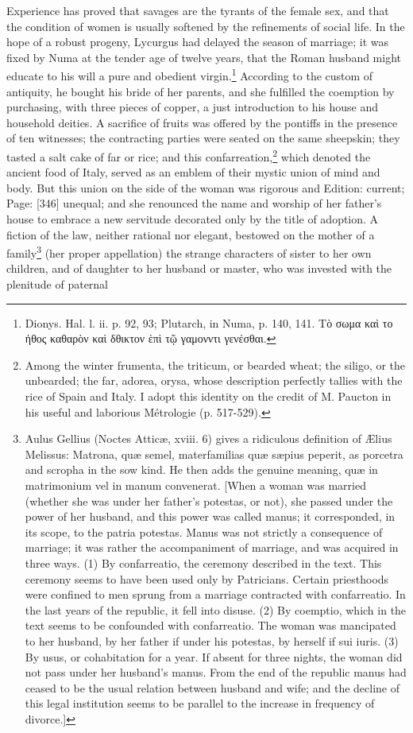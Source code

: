 Experience has proved that savages are the tyrants of the female sex, and that the condition of women is usually softened by the refinements of social life. In the hope of a robust progeny, Lycurgus had delayed the season of marriage; it was fixed by Numa at the tender age of twelve years, that the Roman husband might educate to his will a pure and obedient virgin.\footnote{Dionys. Hal. l. ii. p. 92, 93; Plutarch, in Numa, p. 140, 141. \textgreek{Τ\texthebrew{ὸ} σωμα κα\texthebrew{ὶ} το \texthebrew{ἠ}θος καθαρ\texthebrew{ὸ}ν κα\texthebrew{ὶ} δθικτον \texthebrew{ὲ}π\texthebrew{ὶ} τ\texthebrew{ῷ} γαμονντι γενέσθαι}.} According to the custom of antiquity, he bought his bride of her parents, and she fulfilled the coemption by purchasing, with three pieces of copper, a just introduction to his house and household deities. A sacrifice of fruits was offered by the pontiffs in the presence of ten witnesses; the contracting parties were seated on the same sheepskin; they tasted a salt cake of far or rice; and this confarreation,\footnote{Among the winter frumenta, the triticum, or bearded wheat; the siligo, or the unbearded; the far, adorea, orysa, whose description perfectly tallies with the rice of Spain and Italy. I adopt this identity on the credit of M. Paucton in his useful and laborious Métrologie (p. 517-529).} which denoted the ancient food of Italy, served as an emblem of their mystic union of mind and body. But this union on the side of the woman was rigorous and Edition: current; Page: [346] unequal; and she renounced the name and worship of her father\texthebrew{}’s house to embrace a new servitude decorated only by the title of adoption. A fiction of the law, neither rational nor elegant, bestowed on the mother of a family\footnote{Aulus Gellius (Noctes Atticæ, xviii. 6) gives a ridiculous definition of Ælius Melissus: Matrona, quæ semel, materfamilias quæ sæpius peperit, as porcetra and scropha in the sow kind. He then adds the genuine meaning, quæ in matrimonium vel in manum convenerat. [When a woman was married (whether she was under her father\texthebrew{}’s potestas, or not), she passed under the power of her husband, and this power was called manus; it corresponded, in its scope, to the patria potestas. Manus was not strictly a consequence of marriage; it was rather the accompaniment of marriage, and was acquired in three ways. (1) By confarreatio, the ceremony described in the text. This ceremony seems to have been used only by Patricians. Certain priesthoods were confined to men sprung from a marriage contracted with confarreatio. In the last years of the republic, it fell into disuse. (2) By coemptio, which in the text seems to be confounded with confarreatio. The woman was mancipated to her husband, by her father if under his potestas, by herself if sui iuris. (3) By usus, or cohabitation for a year. If absent for three nights, the woman did not pass under her husband\texthebrew{}’s manus. From the end of the republic manus had ceased to be the usual relation between husband and wife; and the decline of this legal institution seems to be parallel to the increase in frequency of divorce.]} (her proper appellation) the strange characters of sister to her own children, and of daughter to her husband or master, who was invested with the plenitude of paternal 
